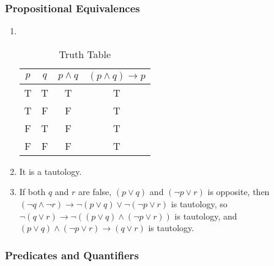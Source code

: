 \documentclass{sig-alternate-05-2015}
\begin{document}
\subsubsection{Propositional Equivalences}
\begin{enumerate}
\item {\ }
\begin{table}[htb]
	\centering
	\caption{Truth Table}
	\begin{tabular}{cccc} \toprule
		$p$ & $q$ & $p \wedge q$ & $(p \wedge q) \rightarrow p$\\ \midrule
		T & T & T & T\\ 
		T & F & F & T\\
		F & T & F & T\\
		F & F & F & T\\
		\hline\end{tabular}
\end{table}


\item It is a tautology.

\item If both $q$ and $r$ are false, $(p \vee q)$ and $(\neg p \vee r)$ is opposite, then $(\neg q \wedge \neg r) \rightarrow \neg (p \vee q) \vee \neg (\neg p \vee r)$ is tautology, so $\neg(q \vee r) \rightarrow \neg ((p \vee q) \wedge (\neg p \vee r))$ is tautology, and $(p \vee q) \wedge (\neg p \vee r) \rightarrow (q \vee r)$ is tautology.

\end{enumerate}

\subsubsection{Predicates and Quantifiers}
\end{document}
